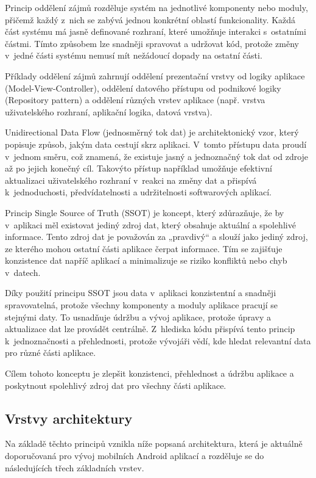 Princip oddělení zájmů rozděluje systém na jednotlivé komponenty nebo moduly, přičemž každý z~nich se zabývá jednou konkrétní 
oblastí funkcionality. Každá část systému má jasně definované rozhraní, které umožňuje interakci s~ostatními částmi. \cite{sapSep}
Tímto způsobem lze snadněji spravovat a udržovat kód, protože změny v~jedné části systému nemusí mít nežádoucí dopady na ostatní části.

Příklady oddělení zájmů zahrnují oddělení prezentační vrstvy od logiky aplikace (Model-View-Controller), oddělení datového přístupu od 
podnikové logiky (Repository pattern) a oddělení různých vrstev aplikace (např. vrstva uživatelského rozhraní, aplikační logika, datová vrstva). 

Unidirectional Data Flow (jednosměrný tok dat) je architektonický vzor, který popisuje způsob, jakým data cestují skrz aplikaci. \cite{andDocArch}
V~tomto přístupu data proudí v~jednom směru, což znamená, že existuje jasný a jednoznačný tok dat od zdroje až po jejich konečný cíl.
Takovýto přístup například umožňuje efektivní aktualizaci uživatelského rozhraní v~reakci na změny dat a přispívá k~jednoduchosti, 
předvídatelnosti a udržitelnosti softwarových aplikací.

Princip Single Source of Truth (SSOT) je koncept, který zdůrazňuje, že by v~aplikaci měl existovat jediný 
zdroj dat, který obsahuje aktuální a spolehlivé informace. \cite{andDocArch} Tento zdroj dat je považován za „pravdivý“ a slouží jako jediný zdroj, 
ze kterého mohou ostatní části aplikace čerpat informace. Tím se zajišťuje konzistence dat napříč aplikací a minimalizuje se riziko 
konfliktů nebo chyb v~datech.

Díky použití principu SSOT jsou data v~aplikaci konzistentní a snadněji spravovatelná, protože všechny komponenty a moduly aplikace pracují se stejnými 
daty. To usnadňuje údržbu a vývoj aplikace, protože úpravy a aktualizace dat lze provádět centrálně. Z~hlediska kódu přispívá tento
princip k~jednoznačnosti a přehlednosti, protože vývojáři vědí, kde hledat relevantní data pro různé části aplikace.

Cílem tohoto konceptu je zlepšit konzistenci, přehlednost a údržbu aplikace a poskytnout spolehlivý zdroj dat pro všechny části aplikace.


\subsection*{Vrstvy architektury} \label{vrstvyArchitekturySection} 
Na základě těchto principů vznikla níže popsaná architektura, která je aktuálně doporučovaná pro vývoj mobilních Android aplikací 
a rozděluje se do následujících třech základních vrstev.

